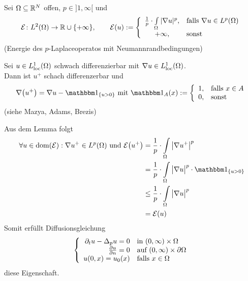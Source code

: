 \begin{beispiel}\enter
	Sei $\Omega\subseteq\mathbb{R}^N$ offen, $p\in]1,\infty[$ und 
	\begin{align*}
		\mathcal{E}\colon L^2(\Omega)\to\mathbb{R}\cup\lbrace+\infty\rbrace,\qquad
		\mathcal{E}(u):=\left\lbrace\begin{array}{cl}
			\frac{1}{p}\cdot\int\limits_\Omega|\nabla u|^p, &\text{falls } \nabla u\in L^p(\Omega)\\
			+\infty,&\text{sonst }
		\end{array}\right.
	\end{align*}
	(Energie des $p$-Laplaceoperatos mit Neumannrandbedingungen)
	
	\begin{lemma}
		Sei $u\in L^1_{\text{loc}}(\Omega)$ schwach differenzierbar mit $\nabla u\in L^1_{\text{loc}}(\Omega)$.\\
		Dann ist $u^+$ schach differenzerbar und 
		\begin{align*}
			\nabla\big(u^+\big)=\nabla u-\indi_{\lbrace u>0\rbrace}\mit
			\indi_A(x):=\left\lbrace\begin{array}{cl}
				1, &\falls x\in A\\
				0, &\sonst
			\end{array}\right.
		\end{align*}
		(siehe Mazya, Adams, Brezis)
	\end{lemma}
	
	Aus dem Lemma folgt
	\begin{align*}
		\forall u\in\dom(\E):\nabla u^+\in L^p(\Omega)\text{ und }
		\E\big(u^+\big)
		&=\frac{1}{p}\cdot\int\limits_\Omega\big|\nabla u^+\big|^p\\
		&=\frac{1}{p}\cdot\int\limits_\Omega\big|\nabla u\big|^p\cdot\indi_{\lbrace u>0\rbrace}\\
		&\leq  \frac{1}{p}\cdot\int\limits_\Omega\big|\nabla u\big|^p\\
		&=\E(u)
	\end{align*}
	Somit erfüllt Diffusionsgleichung
	\begin{align*}
		\left\lbrace\begin{array}{rl}
			\partial_t u-\Delta_p u=0&\text{in }(0,\infty)\times\Omega\\
			\frac{\partial u}{\partial n}=0 &\text{auf }(0,\infty)\times\partial\Omega\\
			u(0,x)=u_0(x) &\text{falls } x\in\Omega
		\end{array}\right.
	\end{align*}
	diese Eigenschaft.	
\end{beispiel}


